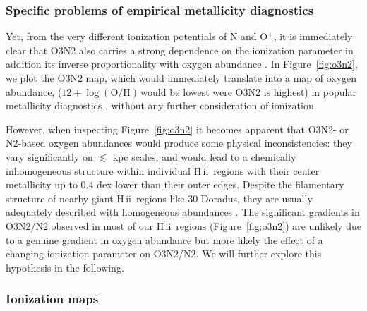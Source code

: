 \documentclass[traditabstract]{aa}
\newcommand{\hii}{\mbox{H\,{\sc ii}}}
\newcommand{\oh}{$12+\log(\mathrm{O/H})$}
\begin{document}
\subsubsection{Specific problems of empirical metallicity diagnostics}

Yet, from the very different ionization potentials of N and O$^{+}$, it is immediately clear that O3N2 also carries a strong dependence on the ionization parameter in addition its inverse proportionality with oxygen abundance \citep[e.g.,][]{1979A&A....78..200A, 2015MNRAS.448.2030H}. In Figure~\ref{fig:o3n2}, we plot the O3N2 map, which would immediately translate into a map of oxygen abundance, (\oh\,would be lowest were O3N2 is highest) in popular metallicity diagnostics \citep[e.g.,][]{2004MNRAS.348L..59P, 2013A&A...559A.114M}, without any further consideration of ionization. 

However, when inspecting Figure~\ref{fig:o3n2} it becomes apparent that O3N2- or N2-based oxygen abundances would produce some physical inconsistencies: they vary significantly on $\lesssim$ kpc scales, and would lead to a chemically inhomogeneous structure within individual \hii~regions with their center metallicity up to 0.4 dex lower than their outer edges. Despite the filamentary structure of nearby giant \hii~regions like 30 Doradus, they are usually adequately described with homogeneous abundances \citep[e.g.,][and references therein]{2011ApJ...738...34P}. The significant gradients in O3N2/N2 observed in most of our \hii~regions (Figure~\ref{fig:o3n2}) are unlikely due to a genuine gradient in oxygen abundance but more likely the effect of a changing ionization parameter on O3N2/N2. We will further explore this hypothesis in the following.

\subsubsection{Ionization maps}
\end{document}
